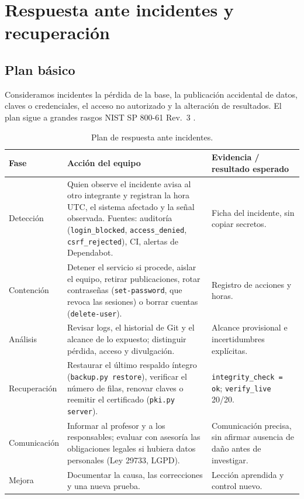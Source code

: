 \documentclass[12pt,a4paper]{article}
\begin{document}
\section{Respuesta ante incidentes y recuperación}
\label{sec:incidentes}
\subsection{Plan básico}
Consideramos incidentes la pérdida de la base, la publicación accidental de datos, claves o credenciales, el acceso no autorizado y la alteración de resultados. El plan sigue a grandes rasgos NIST SP 800-61 Rev.~3 \cite{nistir}.

\begin{table}[H]
\centering\footnotesize
\begin{tabularx}{\textwidth}{P{2.3cm}Y P{4.2cm}}
\toprule
Fase & Acción del equipo & Evidencia / resultado esperado\\
\midrule
Detección & Quien observe el incidente avisa al otro integrante y registran la hora UTC, el sistema afectado y la señal observada. Fuentes: auditoría (\texttt{login\_blocked}, \texttt{access\_denied}, \texttt{csrf\_rejected}), CI, alertas de Dependabot. & Ficha del incidente, sin copiar secretos.\\
Contención & Detener el servicio si procede, aislar el equipo, retirar publicaciones, rotar contraseñas (\texttt{set-password}, que revoca las sesiones) o borrar cuentas (\texttt{delete-user}). & Registro de acciones y horas.\\
Análisis & Revisar logs, el historial de Git y el alcance de lo expuesto; distinguir pérdida, acceso y divulgación. & Alcance provisional e incertidumbres explícitas.\\
Recuperación & Restaurar el último respaldo íntegro (\texttt{backup.py restore}), verificar el número de filas, renovar claves o reemitir el certificado (\texttt{pki.py server}). & \texttt{integrity\_check = ok}; \texttt{verify\_live} 20/20.\\
Comunicación & Informar al profesor y a los responsables; evaluar con asesoría las obligaciones legales si hubiera datos personales (Ley 29733, LGPD). & Comunicación precisa, sin afirmar ausencia de daño antes de investigar.\\
Mejora & Documentar la causa, las correcciones y una nueva prueba. & Lección aprendida y control nuevo.\\
\bottomrule
\end{tabularx}
\caption{Plan de respuesta ante incidentes.}
\end{table}
\end{document}
